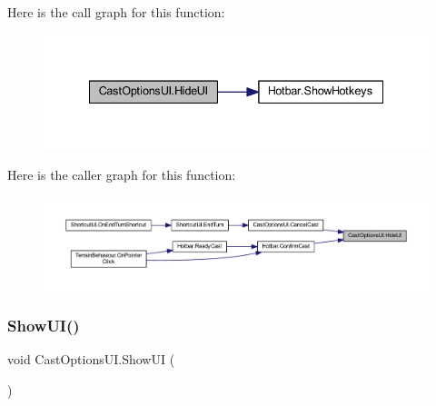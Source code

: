 Here is the call graph for this function\+:
\nopagebreak
\begin{figure}[H]
\begin{center}
\leavevmode
\includegraphics[width=335pt]{class_cast_options_u_i_affc98e48b03c51f4dddda5cb96920697_cgraph}
\end{center}
\end{figure}
Here is the caller graph for this function\+:
\nopagebreak
\begin{figure}[H]
\begin{center}
\leavevmode
\includegraphics[width=350pt]{class_cast_options_u_i_affc98e48b03c51f4dddda5cb96920697_icgraph}
\end{center}
\end{figure}
\mbox{\label{class_cast_options_u_i_a37c4fa85c666ede5418cd5d7e524ce35}} 
\subsubsection{\texorpdfstring{ShowUI()}{ShowUI()}}
{\footnotesize\ttfamily void Cast\+Options\+U\+I.\+Show\+UI (\begin{DoxyParamCaption}{ }\end{DoxyParamCaption})}

